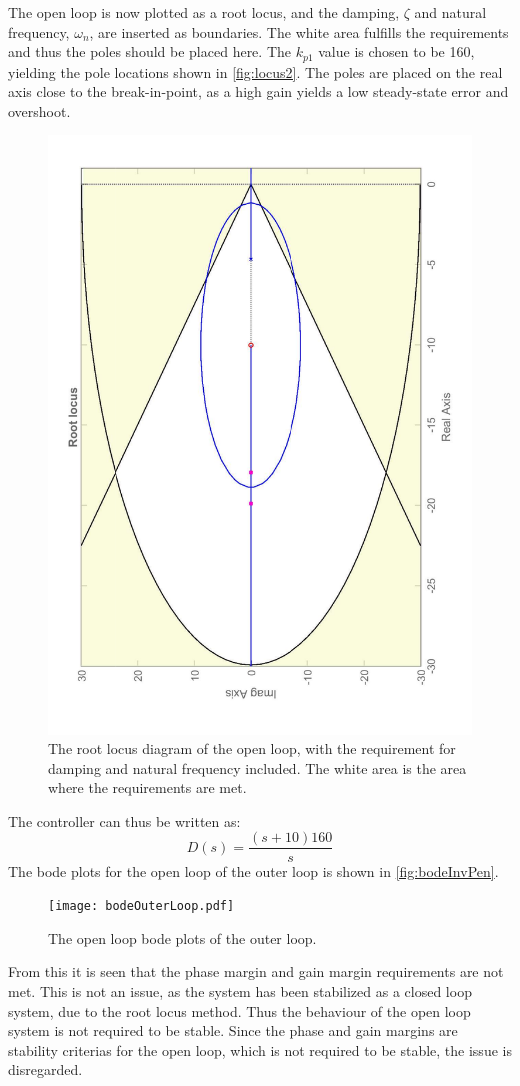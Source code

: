 The open loop is now plotted as a root locus, and the damping, $\zeta$ and natural frequency, $\omega_n$, are inserted as boundaries. The white area fulfills the requirements and thus the poles should be placed here. The $k_{p1}$ value is chosen to be 160, yielding the pole locations shown in \autoref{fig:locus2}. The poles are placed on the real axis close to the break-in-point, as a high gain yields a low steady-state error and overshoot.
\vspace{-1 cm}
\begin{figure}[H]
\centering
\includegraphics[height=0.75\textwidth,angle = -90]{figures/locusReq.pdf}
\caption{The root locus diagram of the open loop, with the requirement for damping and natural frequency included. The white area is the area where the requirements are met.}
\label{fig:locus2}
\end{figure}
\vspace{-0.5 cm}
The controller can thus be written as:
\begin{equation}
D(s) = \frac{(s + 10)160}{s}
\end{equation}
The bode plots for the open loop of the outer loop is shown in \autoref{fig:bodeInvPen}.
\begin{figure}[H]
\centering
\texttt{[image: bodeOuterLoop.pdf]}
\vspace{-0.7 cm}
\caption{The open loop bode plots of the outer loop.}
\label{fig:bodeInvPen}
\end{figure}
From this it is seen that the phase margin and gain margin requirements are not met. This is not an issue, as the system has been stabilized as a closed loop system, due to the root locus method. Thus the behaviour of the open loop system is not required to be stable. Since the phase and gain margins are stability criterias for the open loop, which is not required to be stable, the issue is disregarded.
